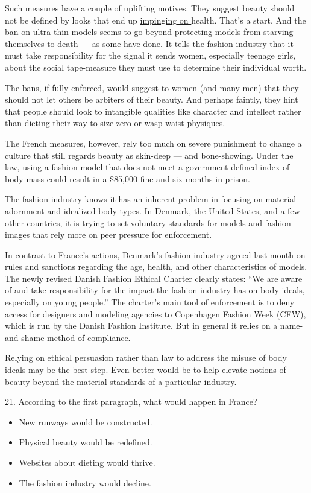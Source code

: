\documentclass[UTF8,11pt]{ctexart}
\begin{document}
Such measures have a couple of uplifting motives. They suggest beauty should not be defined by looks that end up \uline{impinging on }health. That’s a start. And the ban on ultra-thin models seems to go beyond protecting models from starving themselves to death — as some have done. It tells the fashion industry that it must take responsibility for the signal it sends women, especially teenage girls, about the social tape-measure they must use to determine their individual worth.


The bans, if fully enforced, would suggest to women (and many men) that they should not let others be arbiters of their beauty. And perhaps faintly, they hint that people should look to intangible qualities like character and intellect rather than dieting their way to size zero or wasp-waist physiques.


The French measures, however, rely too much on severe punishment to change a culture that still regards beauty as skin-deep — and bone-showing. Under the law, using a fashion model that does not meet a government-defined index of body mass could result in a \$85,000 fine and six months in prison.


The fashion industry knows it has an inherent problem in focusing on material adornment and idealized body types. In Denmark, the United States, and a few other countries, it is trying to set voluntary standards for models and fashion images that rely more on peer pressure for enforcement.


In contrast to France’s actions, Denmark’s fashion industry agreed last month on rules and sanctions regarding the age, health, and other characteristics of models. The newly revised Danish Fashion Ethical Charter clearly states: “We are aware of and take responsibility for the impact the fashion industry has on body ideals, especially on young people.” The charter’s main tool of enforcement is to deny access for designers and modeling agencies to Copenhagen Fashion Week (CFW), which is run by the Danish Fashion Institute. But in general it relies on a name-and-shame method of compliance.


Relying on ethical persuasion rather than law to address the misuse of body ideals may be the best step. Even better would be to help elevate notions of beauty beyond the material standards of a particular industry.


21. According to the first paragraph, what would happen in France?


\begin{itemize}[leftmargin=2em,itemsep=.2em,topsep=.4em]\item[A.] New runways would be constructed.
\item[B.] Physical beauty would be redefined.
\item[C.] Websites about dieting would thrive.
\item[D.] The fashion industry would decline.
\end{itemize}
\end{document}
